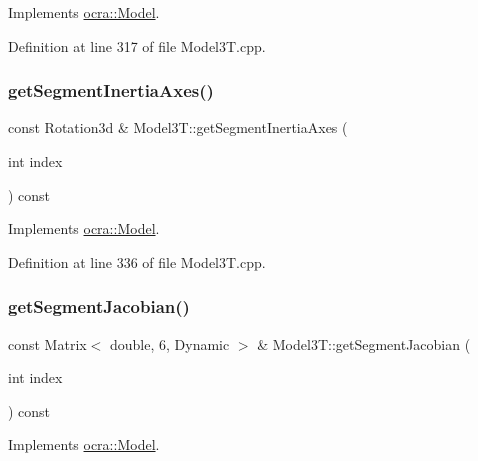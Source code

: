 Implements \hyperlink{classocra_1_1Model_a577292e1e1441afbecb3912124b7eb04}{ocra\+::\+Model}.



Definition at line 317 of file Model3\+T.\+cpp.

\hypertarget{classModel3T_a40cf731f4ab38620127021aaa68d387a}{}\label{classModel3T_a40cf731f4ab38620127021aaa68d387a} 
\subsubsection{\texorpdfstring{get\+Segment\+Inertia\+Axes()}{getSegmentInertiaAxes()}}
{\footnotesize\ttfamily const Rotation3d \& Model3\+T\+::get\+Segment\+Inertia\+Axes (\begin{DoxyParamCaption}\item[{int}]{index }\end{DoxyParamCaption}) const\hspace{0.3cm}{\ttfamily [virtual]}}



Implements \hyperlink{classocra_1_1Model_a09d58bf429940098baf9727140e37441}{ocra\+::\+Model}.



Definition at line 336 of file Model3\+T.\+cpp.

\hypertarget{classModel3T_a3c138d685389144406ab0bd219e7bb36}{}\label{classModel3T_a3c138d685389144406ab0bd219e7bb36} 
\subsubsection{\texorpdfstring{get\+Segment\+Jacobian()}{getSegmentJacobian()}}
{\footnotesize\ttfamily const Matrix$<$ double, 6, Dynamic $>$ \& Model3\+T\+::get\+Segment\+Jacobian (\begin{DoxyParamCaption}\item[{int}]{index }\end{DoxyParamCaption}) const\hspace{0.3cm}{\ttfamily [virtual]}}



Implements \hyperlink{classocra_1_1Model_a626aed0875f6336c2ecc0147bc8c7d4e}{ocra\+::\+Model}.



